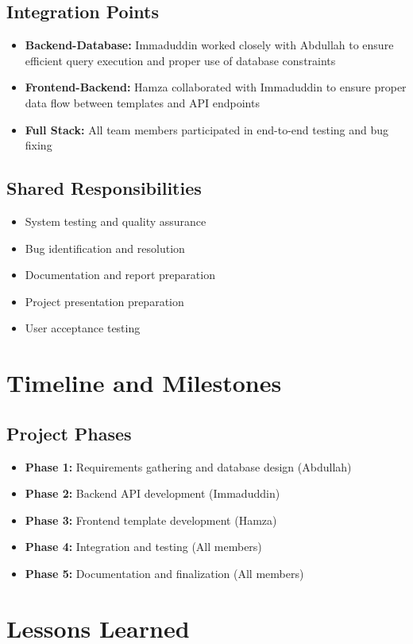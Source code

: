 \documentclass[12pt,a4paper,openany]{report}
\begin{document}
\subsection{Integration Points}
\begin{itemize}
\item \textbf{Backend-Database:} Immaduddin worked closely with Abdullah to ensure efficient query execution and proper use of database constraints
\item \textbf{Frontend-Backend:} Hamza collaborated with Immaduddin to ensure proper data flow between templates and API endpoints
\item \textbf{Full Stack:} All team members participated in end-to-end testing and bug fixing
\end{itemize}
\subsection{Shared Responsibilities}
\begin{itemize}
\item System testing and quality assurance
\item Bug identification and resolution
\item Documentation and report preparation
\item Project presentation preparation
\item User acceptance testing
\end{itemize}
\section{Timeline and Milestones}
\subsection{Project Phases}
\begin{itemize}
\item \textbf{Phase 1:} Requirements gathering and database design (Abdullah)
\item \textbf{Phase 2:} Backend API development (Immaduddin)
\item \textbf{Phase 3:} Frontend template development (Hamza)
\item \textbf{Phase 4:} Integration and testing (All members)
\item \textbf{Phase 5:} Documentation and finalization (All members)
\end{itemize}
\section{Lessons Learned}
\end{document}

